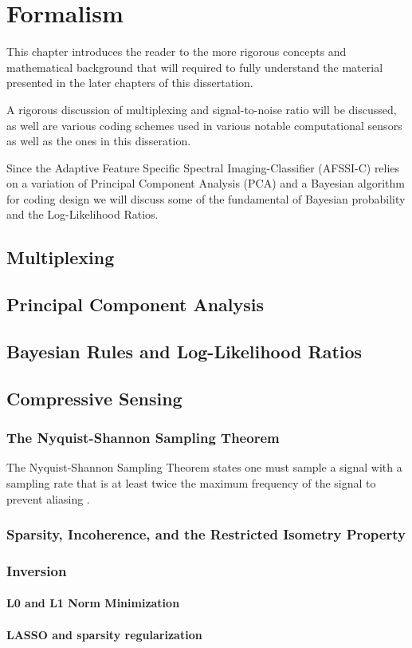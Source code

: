 \chapter{Formalism}\label{chap:Formalism}

This chapter introduces the reader to the more rigorous concepts and mathematical background that will required to fully understand the material presented in the later chapters of this dissertation. 

A rigorous discussion of multiplexing and signal-to-noise ratio will be discussed, as well are various coding schemes used in various notable computational sensors as well as the ones in this disseration. 

Since the Adaptive Feature Specific Spectral Imaging-Classifier (AFSSI-C) relies on a variation of Principal Component Analysis (PCA) and a Bayesian algorithm for coding design we will discuss some of the fundamental of Bayesian probability and the Log-Likelihood Ratios. 



\section{Multiplexing}

\section{Principal Component Analysis}

\section{Bayesian Rules and Log-Likelihood Ratios}

\section{Compressive Sensing}

\subsection{The Nyquist-Shannon Sampling Theorem}

The Nyquist-Shannon Sampling Theorem states one must sample a signal with a sampling rate that is at least twice the maximum frequency of the signal to prevent aliasing \cite{shannon1949communication}.


\subsection{Sparsity, Incoherence, and the Restricted Isometry Property}

\subsection{Inversion}

\subsubsection{L0 and L1 Norm Minimization}

\subsubsection{LASSO and sparsity regularization}

%  
%



